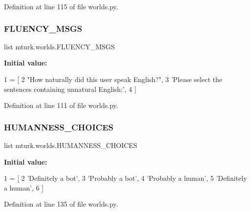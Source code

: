 Definition at line 115 of file worlds.\+py.

\mbox{\label{namespacemturk_1_1worlds_a3dc44ca75f2a908d9625d7945ee2b111}} 
\subsubsection{\texorpdfstring{F\+L\+U\+E\+N\+C\+Y\+\_\+\+M\+S\+GS}{FLUENCY\_MSGS}}
{\footnotesize\ttfamily list mturk.\+worlds.\+F\+L\+U\+E\+N\+C\+Y\+\_\+\+M\+S\+GS}

{\bfseries Initial value\+:}
\begin{DoxyCode}
1 =  [
2     \textcolor{stringliteral}{"How naturally did this user speak English?"},
3     \textcolor{stringliteral}{'Please select the sentences containing unnatural English:'},
4 ]
\end{DoxyCode}


Definition at line 111 of file worlds.\+py.

\mbox{\label{namespacemturk_1_1worlds_aeedbec4c9537e055ef52c6fb5b234715}} 
\subsubsection{\texorpdfstring{H\+U\+M\+A\+N\+N\+E\+S\+S\+\_\+\+C\+H\+O\+I\+C\+ES}{HUMANNESS\_CHOICES}}
{\footnotesize\ttfamily list mturk.\+worlds.\+H\+U\+M\+A\+N\+N\+E\+S\+S\+\_\+\+C\+H\+O\+I\+C\+ES}

{\bfseries Initial value\+:}
\begin{DoxyCode}
1 =  [
2     \textcolor{stringliteral}{'Definitely a bot'},
3     \textcolor{stringliteral}{'Probably a bot'},
4     \textcolor{stringliteral}{'Probably a human'},
5     \textcolor{stringliteral}{'Definitely a human'},
6 ]
\end{DoxyCode}


Definition at line 135 of file worlds.\+py.

